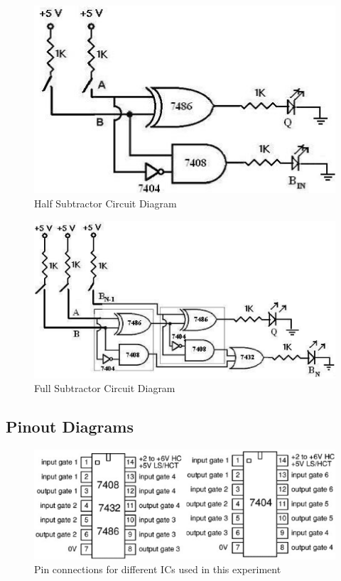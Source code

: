 \begin{figure}[H]
    \centering
    \includegraphics[width=0.5\columnwidth]{images/c-half-sub.png}
    \caption{Half Subtractor Circuit Diagram}
    \label{half-subt}
\end{figure}

\begin{figure}[H]
    \centering
    \includegraphics[width=0.85\columnwidth]{images/c-full-sub.png}
    \caption{Full Subtractor Circuit Diagram}
    \label{full-subt}
\end{figure}

\subsection*{Pinout Diagrams}
\begin{figure}[H]
    \centering
    \includegraphics[width=1\columnwidth]{images/pinout.png}
    \caption{Pin connections for different ICs used in this experiment}
    \label{pinout}
\end{figure}